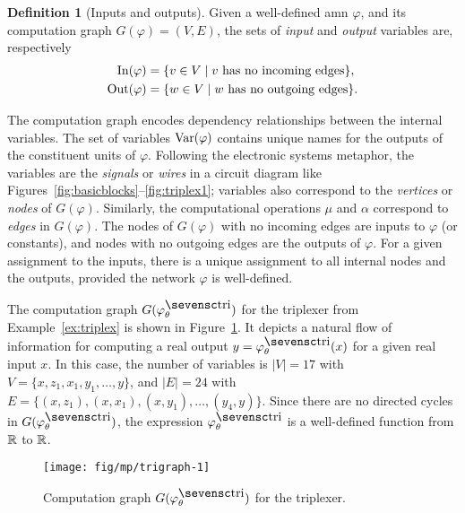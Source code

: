 \documentclass[10pt]{article}
\newcommand{\amn}{\varphi}
\newcommand{\Var}{\mathop{\rm Var}}
\newcommand{\Input}{\mathop{\rm In}}
\newcommand{\Output}{\mathop{\rm Out}}
\theoremstyle{remark}
\theoremstyle{definition}
\newtheorem{definition}{Definition}
\theoremstyle{plain}
\begin{document}
\begin{definition}[Inputs and outputs]
Given a well-defined \acs{amn} $\amn$, and its computation graph
$G(\varphi)=(V,E)$, the sets of \emph{input} and \emph{output} variables are,
respectively
\begin{align*}
	\Input(\varphi) &= \{ v \in V \mid 
		v \text{ has no incoming edges}\},\\
	\Output(\varphi) &= \{ w \in V \mid 
		w \text{ has no outgoing edges}\}.
\end{align*}
\end{definition}

The computation graph encodes dependency relationships between the internal
variables.  The set of variables $\Var(\amn)$ contains unique names for the
outputs of the constituent units of $\amn$. 
Following the electronic systems metaphor, the variables are the
\emph{signals} or \emph{wires} in a circuit diagram like
Figures~\ref{fig:basicblocks}--\ref{fig:triplex1}; variables also correspond to
the \emph{vertices} or \emph{nodes} of $G(\amn)$. Similarly, the computational
operations $\mu$ and $\alpha$ correspond to \emph{edges} in $G(\amn)$.
The nodes of $G(\amn)$ with no incoming edges are inputs to $\amn$ (or
constants), and nodes with no outgoing edges are the outputs of $\amn$. 
For a given assignment to the inputs, there is a unique assignment to all
internal nodes and the outputs, provided the network $\amn$ is well-defined.

The computation graph $G(\amn^\mathsc{tri}_\theta)$ for the triplexer from
Example~\ref{ex:triplex} is shown in Figure~\ref{fig:trigraph1}.
It depicts a natural flow of information for computing a real output
$y=\amn^\mathsc{tri}_\theta(x)$ for a given real input $x$.
In this case, the number of variables is
$|V|=17$ with $V = \{x,z_1,x_1,y_1,\ldots,y\}$,
and
$|E|=24$ with $E = \{ (x,z_1),(x,x_1),(x,y_1),\ldots,(y_4,y) \}$. 
Since there are no directed cycles in $G(\amn^\mathsc{tri}_\theta)$, the
expression $\amn^\mathsc{tri}_\theta$ is a well-defined function from $\mathbb{R}$
to $\mathbb{R}$.

\begin{figure}[htpb]
	\centering
	\texttt{[image: fig/mp/trigraph-1]}
	\caption{Computation graph $G(\amn^\mathsc{tri}_\theta)$ for the triplexer.}
	\label{fig:trigraph1}
\end{figure}
\end{document}
